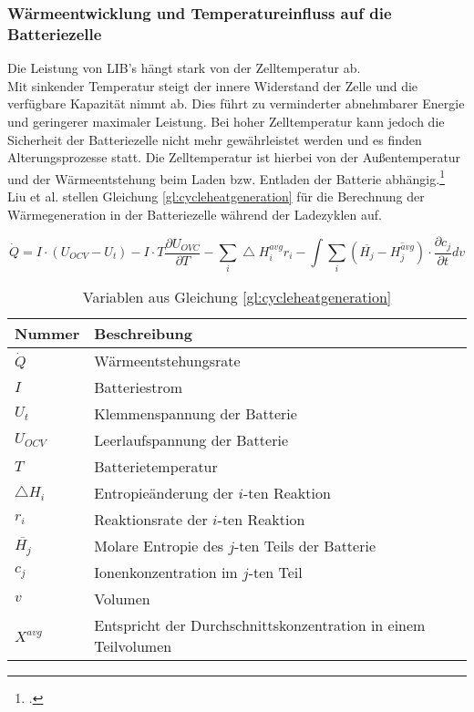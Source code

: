 \subsubsection*{Wärmeentwicklung und Temperatureinfluss auf die Batteriezelle}\label{subsub:waermeundtemperatur}

Die Leistung von LIB's hängt stark von der Zelltemperatur ab. \\
Mit sinkender Temperatur steigt der innere Widerstand der Zelle und die verfügbare Kapazität nimmt ab. Dies führt zu verminderter abnehmbarer Energie und geringerer maximaler Leistung. Bei hoher Zelltemperatur kann jedoch die Sicherheit der Batteriezelle nicht mehr gewährleistet werden und es finden Alterungsprozesse statt. Die Zelltemperatur ist hierbei von der Außentemperatur und der Wärmeentstehung beim Laden bzw. Entladen der Batterie abhängig.\footcite[Vgl.\label{cite:Liu}][S.1001-1010]{Liu2014} \\
Liu et al. stellen Gleichung \ref{gl:cycleheatgeneration} für die Berechnung der Wärmegeneration in der Batteriezelle während der Ladezyklen auf.


\begin{equation}\label{gl:cycleheatgeneration}
		\dot{Q} = I \cdot (U_{OCV} - U_{t}) 
		- I \cdot T \frac{\partial U_{OVC}}{\partial T} 
		- \sum_{i}^{ } \bigtriangleup H_{i}^{avg}r_{i}
		- \int \sum_{i}^{ } (\overline{H_{j}} - \overline{H_{j}^{avg}})	\cdot \frac{\partial c_{j}}{\partial t} dv
\end{equation}

\begin{table}[h!]
	\caption{Variablen aus Gleichung \ref{gl:cycleheatgeneration}}
	\label{tab:variablenheatgeneration}
	\vspace{0.2cm}	
	\begin{tabularx}{\textwidth}{ |X|X|  }
		\toprule[1.5pt]
		\textbf{Nummer} & \textbf{Beschreibung} \\
		\hline\hline
		$\dot{Q}$ & Wärmeentstehungsrate \\
		\hline
		$I$ & Batteriestrom\\
		\hline
		$U_{t}$ & Klemmenspannung der Batterie\\
		\hline
		$U_{OCV}$ & Leerlaufspannung der Batterie\\
		\hline
		$T$ & Batterietemperatur\\
		\hline
		$\bigtriangleup H_{i}$ & Entropieänderung der $i$-ten Reaktion \\
		\hline
		$r_{i}$ & Reaktionsrate der $i$-ten Reaktion\\
		\hline
		$\overline{H_{j}}$ & Molare Entropie des $j$-ten Teils der Batterie\\
		\hline
		$c_{j}$ & Ionenkonzentration im $j$-ten Teil\\
		\hline
		$v$ & Volumen\\
		\hline
		$X^{avg}$ & Entspricht der Durchschnittskonzentration in einem Teilvolumen\\
		\bottomrule[1.5pt]
	\end{tabularx}		
\end{table}

